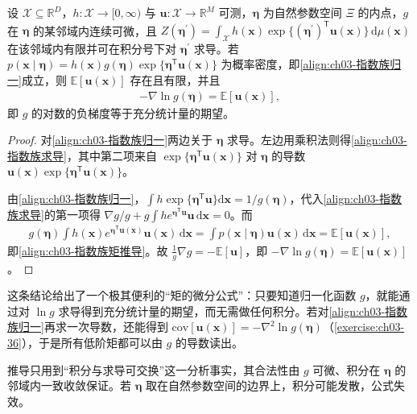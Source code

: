 \documentclass[../../main.tex]{subfiles}
\begin{document}
\begin{proposition}[指数族的矩]\label{proposition:ch03-指数族矩}
设 $\mathcal{X}\subseteq\mathbb{R}^{D}$，$h:\mathcal{X}\to[0,\infty)$ 与 $\boldsymbol{u}:\mathcal{X}\to\mathbb{R}^{M}$ 可测，$\boldsymbol{\eta}$ 为自然参数空间 $\Xi$ 的内点，$g$ 在 $\boldsymbol{\eta}$ 的某邻域内连续可微，且 $Z(\boldsymbol{\eta}^{\prime})=\int_{\mathcal{X}}h(\boldsymbol{x})\exp\{(\boldsymbol{\eta}^{\prime})^{\mathsf{T}}\boldsymbol{u}(\boldsymbol{x})\}\,\mathrm{d}\mu(\boldsymbol{x})$ 在该邻域内有限并可在积分号下对 $\boldsymbol{\eta}^{\prime}$ 求导。若 $p(\boldsymbol{x}\mid\boldsymbol{\eta})=h(\boldsymbol{x})g(\boldsymbol{\eta})\exp\{\boldsymbol{\eta}^{\mathsf{T}}\boldsymbol{u}(\boldsymbol{x})\}$ 为概率密度，即\eqref{align:ch03-指数族归一}成立，则 $\mathbb{E}[\boldsymbol{u}(\boldsymbol{x})]$ 存在且有限，并且
\begin{align*}
-\nabla\ln g(\boldsymbol{\eta})=\mathbb{E}[\boldsymbol{u}(\boldsymbol{x})],
\end{align*}
即 $g$ 的对数的负梯度等于充分统计量的期望。
\end{proposition}
\begin{proof}
对\eqref{align:ch03-指数族归一}两边关于 $\boldsymbol{\eta}$ 求导。左边用乘积法则得\eqref{align:ch03-指数族求导}，其中第二项来自 $\exp\{\boldsymbol{\eta}^{\mathsf{T}}\boldsymbol{u}(\boldsymbol{x})\}$ 对 $\boldsymbol{\eta}$ 的导数 $\boldsymbol{u}(\boldsymbol{x})\exp\{\boldsymbol{\eta}^{\mathsf{T}}\boldsymbol{u}(\boldsymbol{x})\}$。

由\eqref{align:ch03-指数族归一}，$\int h\exp\{\boldsymbol{\eta}^{\mathsf{T}}\boldsymbol{u}\}\mathrm{d}\boldsymbol{x}=1/g(\boldsymbol{\eta})$，代入\eqref{align:ch03-指数族求导}的第一项得 $\nabla g/g+g\int h e^{\boldsymbol{\eta}^{\mathsf{T}}\boldsymbol{u}}\boldsymbol{u}\,\mathrm{d}\boldsymbol{x}=0$。而
\begin{align*}
g(\boldsymbol{\eta})\int h(\boldsymbol{x})e^{\boldsymbol{\eta}^{\mathsf{T}}\boldsymbol{u}(\boldsymbol{x})}\boldsymbol{u}(\boldsymbol{x})\,\mathrm{d}\boldsymbol{x}=\int p(\boldsymbol{x}\mid\boldsymbol{\eta})\boldsymbol{u}(\boldsymbol{x})\,\mathrm{d}\boldsymbol{x}=\mathbb{E}[\boldsymbol{u}(\boldsymbol{x})],
\end{align*}
即\eqref{align:ch03-指数族矩推导}。故 $\frac{1}{g}\nabla g=-\mathbb{E}[\boldsymbol{u}]$，即 $-\nabla\ln g(\boldsymbol{\eta})=\mathbb{E}[\boldsymbol{u}(\boldsymbol{x})]$。
\end{proof}

\begin{remark}
这条结论给出了一个极其便利的“矩的微分公式”：只要知道归一化函数 $g$，就能通过对 $\ln g$ 求导得到充分统计量的期望，而无需做任何积分。若对\eqref{align:ch03-指数族归一}再求一次导数，还能得到 $\mathrm{cov}[\boldsymbol{u}(\boldsymbol{x})]=-\nabla^{2}\ln g(\boldsymbol{\eta})$（\cref{exercise:ch03-36}），于是所有低阶矩都可以由 $g$ 的导数读出。

推导只用到“积分与求导可交换”这一分析事实，其合法性由 $g$ 可微、积分在 $\boldsymbol{\eta}$ 的邻域内一致收敛保证。若 $\boldsymbol{\eta}$ 取在自然参数空间的边界上，积分可能发散，公式失效。
\end{remark}
\end{document}
